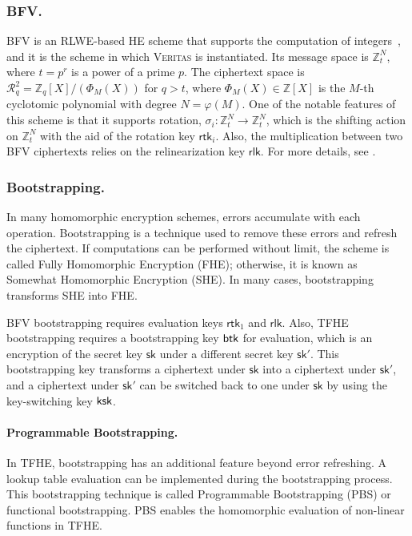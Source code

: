 \documentclass[runningheads]{llncs}
\newcommand{\sk}{\textsf{sk}{}}
\newcommand{\rlk}{\textsf{rlk}{}}
\newcommand{\rtk}{\textsf{rtk}{}}
\begin{document}
    \subsubsection{BFV.}
        BFV is an RLWE-based HE scheme that supports the computation of integers~\cite{bfv}, and it is the scheme in which \textsc{Veritas} is instantiated. Its message space is \( \mathbb{Z}_t^N \), where \( t=p^r \) is a power of a prime \( p \). The ciphertext space is \( \mathcal{R}^2_q=\mathbb{Z}_q[X]/(\Phi_{M}(X)) \) for \( q>t \), where \( \Phi_{M}(X)\in \mathbb{Z}[X] \) is the \( M \)-th cyclotomic polynomial with degree \( N=\varphi(M) \). One of the notable features of this scheme is that it supports rotation, \( \sigma_i:\mathbb{Z}_t^N\to \mathbb{Z}_t^N \), which is the shifting action on \( \mathbb{Z}_t^N \) with the aid of the rotation key \( \rtk_i \). Also, the multiplication between two BFV ciphertexts relies on the relinearization key \( \rlk \). For more details, see \cite{BFVHElib}.

    \subsubsection{Bootstrapping.}
    In many homomorphic encryption schemes, errors accumulate with each operation. Bootstrapping is a technique used to remove these errors and refresh the ciphertext. If computations can be performed without limit, the scheme is called Fully Homomorphic Encryption (FHE); otherwise, it is known as Somewhat Homomorphic Encryption (SHE). In many cases, bootstrapping transforms SHE into FHE. 
    
    BFV bootstrapping requires evaluation keys $\rtk_1$ and $\rlk$. Also, TFHE bootstrapping requires a bootstrapping key $\sf{btk}$ for evaluation, which is an encryption of the secret key $\sk$ under a different secret key $\sk'$. This bootstrapping key transforms a ciphertext under $\sk$ into a ciphertext under $\sk'$, and a ciphertext under $\sk'$ can be switched back to one under $\sk$ by using the key-switching key $\sf{ksk}$.
        
        \paragraph{Programmable Bootstrapping.}
        In TFHE, bootstrapping has an additional feature beyond error refreshing. A lookup table evaluation can be implemented during the bootstrapping process. This bootstrapping technique is called Programmable Bootstrapping (PBS) or functional bootstrapping. PBS enables the homomorphic evaluation of non-linear functions in TFHE.
        
\end{document}
